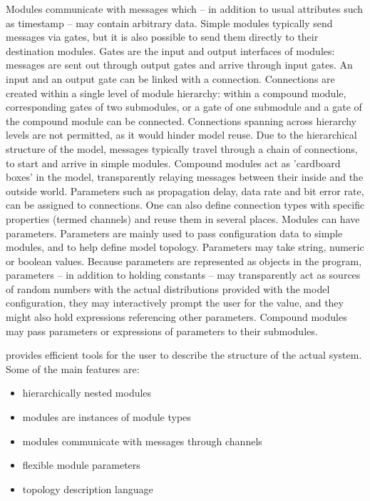 Modules communicate with messages which -- in addition to
usual attributes such as timestamp -- may contain arbitrary
data. Simple modules typically send messages via gates, but it is also
possible to send them directly to their destination modules. Gates are the
input and output interfaces of modules: messages are sent out through
output gates and arrive through input gates. An input and an output gate
can be linked with a connection. Connections are created within a single
level of module hierarchy: within a compound module, corresponding gates of
two submodules, or a gate of one submodule and a gate of the compound
module can be connected. Connections spanning across hierarchy levels are
not permitted, as it would hinder model reuse. Due to the hierarchical
structure of the model, messages typically travel through a chain of
connections, to start and arrive in simple modules. Compound modules act as
'cardboard boxes' in the model, transparently relaying messages between
their inside and the outside world. Parameters such as propagation delay,
data rate and bit error rate, can be assigned to connections. One can also
define connection types with specific properties (termed channels) and
reuse them in several places. Modules can have parameters. Parameters are
mainly used to pass configuration data to simple modules, and to help
define model topology. Parameters may take string, numeric or boolean
values. Because parameters are represented as objects in the program,
parameters -- in addition to holding constants -- may transparently act as
sources of random numbers with the actual distributions provided with the
model configuration, they may interactively prompt the user for the value,
and they might also hold expressions referencing other parameters. Compound
modules may pass parameters or expressions of parameters to their
submodules.






{\opp} provides efficient tools for the user to describe the
structure of the actual system. Some of the main features are:
\begin{itemize}
\item{hierarchically nested modules}
\item{modules are instances of module types}
\item{modules communicate with messages through channels}
\item{flexible module parameters}
\item{topology description language}
\end{itemize}

